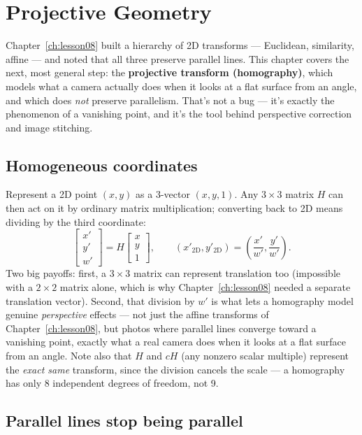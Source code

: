 \chapter{Projective Geometry}
\label{ch:lesson24}

Chapter~\ref{ch:lesson08} built a hierarchy of 2D transforms --- Euclidean, similarity, affine --- and noted that all three preserve parallel lines. This chapter covers the next, most general step: the \textbf{projective transform (homography)}, which models what a camera actually does when it looks at a flat surface from an angle, and which does \emph{not} preserve parallelism. That's not a bug --- it's exactly the phenomenon of a vanishing point, and it's the tool behind perspective correction and image stitching.

\section{Homogeneous coordinates}

Represent a 2D point $(x,y)$ as a 3-vector $(x,y,1)$. Any $3\times3$ matrix $H$ can then act on it by ordinary matrix multiplication; converting back to 2D means dividing by the third coordinate:
\begin{equation}
\begin{bmatrix}x'\\y'\\w'\end{bmatrix} = H\begin{bmatrix}x\\y\\1\end{bmatrix}, \qquad (x'_{\text{2D}}, y'_{\text{2D}}) = \left(\frac{x'}{w'}, \frac{y'}{w'}\right).
\end{equation}
Two big payoffs: first, a $3\times3$ matrix can represent translation too (impossible with a $2\times2$ matrix alone, which is why Chapter~\ref{ch:lesson08} needed a separate translation vector). Second, that division by $w'$ is what lets a homography model genuine \emph{perspective} effects --- not just the affine transforms of Chapter~\ref{ch:lesson08}, but photos where parallel lines converge toward a vanishing point, exactly what a real camera does when it looks at a flat surface from an angle. Note also that $H$ and $cH$ (any nonzero scalar multiple) represent the \emph{exact same} transform, since the division cancels the scale --- a homography has only 8 independent degrees of freedom, not 9.

\section{Parallel lines stop being parallel}

